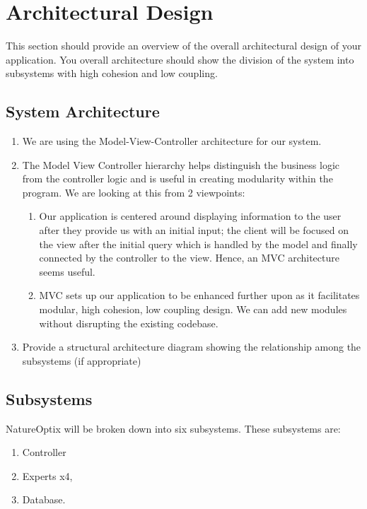 \documentclass[]{article}
\begin{document}
\section{Architectural Design}
\label{sec:architectural_design}
This section should provide an overview of the overall architectural design of your application. You overall architecture should show the division of the system into subsystems with high cohesion and low coupling.

\subsection{System Architecture}
\label{sub:system_architecture}
\begin{enumerate}[1)]
	\item We are using the Model-View-Controller architecture for our system.
	\item The Model View Controller hierarchy helps distinguish the business logic from the controller logic and is useful in creating modularity within the program. We are looking at this from 2 viewpoints:
	\begin{enumerate}
		\item Our application is centered around displaying information to the user after they provide us with an initial input; the client will be focused on the view after the initial query which is handled by the model and finally connected by the controller to the view. Hence, an MVC architecture seems useful.
		\item MVC sets up our application to be enhanced further upon as it facilitates modular, high cohesion, low coupling design. We can add new modules without disrupting the existing codebase.
	\end{enumerate}
	\item Provide a structural architecture diagram showing the relationship among the subsystems (if appropriate)
\end{enumerate}

\subsection{Subsystems}
\label{sub:subsystems}
NatureOptix will be broken down into six subsystems. These subsystems are:

\begin{enumerate}
	\item Controller %
	\item Experts x4,
	\item Database.
\end{enumerate}
\end{document}
